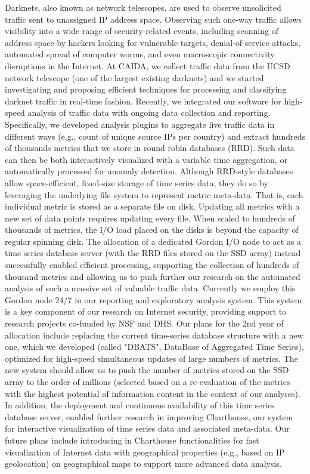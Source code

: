 Darknets, also known as network telescopes, are used to observe
unsolicited traffic sent to unassigned IP address space. Observing such
one-way traffic allows visibility into a wide range of security-related
events, including scanning of address space by hackers looking for
vulnerable targets, denial-of-service attacks, automated spread of
computer worms, and even macroscopic connectivity disruptions in the
Internet. At CAIDA, we collect traffic data from the UCSD network
telescope (one of the largest existing darknets) and we started
investigating and proposing efficient techniques for processing and
classifying darknet traffic in real-time fashion. Recently, we
integrated our software for high-speed analysis of traffic data with
ongoing data collection and reporting. Specifically, we developed
analysis plugins to aggregate live traffic data in different ways (e.g.,
count of unique source IPs per country) and extract hundreds of
thousands metrics that we store in round robin databases (RRD). Such
data can then be both interactively visualized with a variable time
aggregation, or automatically processed for anomaly detection. Although
RRD-style databases allow space-efficient, fixed-size storage of time
series data, they do so by leveraging the underlying file system to
represent metric meta-data. That is, each individual metric is stored as
a separate file on disk. Updating all metrics with a new set of data
points requires updating every file. When scaled to hundreds of
thousands of metrics, the I/O load placed on the disks is beyond the
capacity of regular spinning disk. The allocation of a dedicated Gordon
I/O node to act as a time series database server (with the RRD files
stored on the SSD array) instead successfully enabled efficient
processing, supporting the collection of hundreds of thousand metrics
and allowing us to push further our research on the automated analysis
of such a massive set of valuable traffic data. Currently we employ this
Gordon node 24/7 in our reporting and exploratory analysis system. This
system is a key component of our research on Internet security,
providing support to research projects co-funded by NSF and DHS. Our
plans for the 2nd year of allocation include replacing the current
time-series database structure with a new one, which we developed
(called "DBATS", DataBase of Aggregated Time Series), optimized for
high-speed simultaneous updates of large numbers of metrics. The new
system should allow us to push the number of metrics stored on the SSD
array to the order of millions (selected based on a re-evaluation of the
metrics with the highest potential of information content in the context
of our analyses). In addition, the deployment and continuous
availability of this time series database server, enabled further
research in improving Charthouse, our system for interactive
visualization of time series data and associated meta-data. Our future
plans include introducing in Charthouse functionalities for fast
visualization of Internet data with geographical properties (e.g., based
on IP geolocation) on geographical maps to support more advanced data
analysis.

